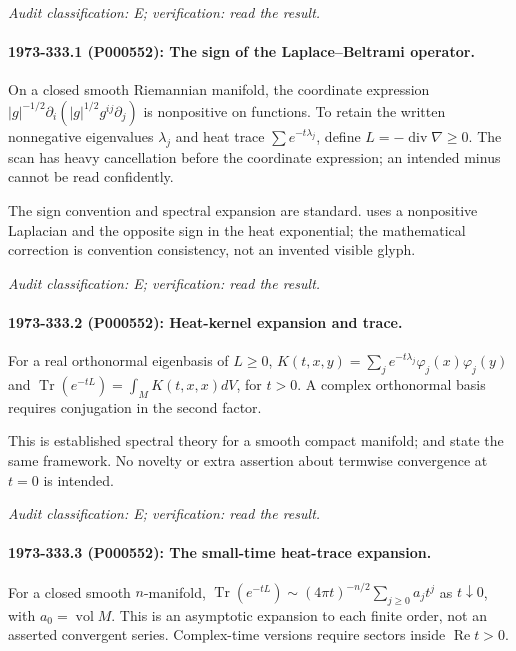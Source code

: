 \emph{Audit classification: E; verification: read the result.}

\paragraph{1973-333.1 (P000552): The sign of the Laplace--Beltrami operator.}
On a closed smooth Riemannian manifold, the coordinate expression \(|g|^{-1/2}\partial_i(|g|^{1/2}g^{ij}\partial_j)\) is nonpositive on functions. To retain the written nonnegative eigenvalues \(\lambda_j\) and heat trace \(\sum e^{-t\lambda_j}\), define \(L=-\operatorname{div}\nabla\ge0\). The scan has heavy cancellation before the coordinate expression; an intended minus cannot be read confidently.

The sign convention and spectral expansion are standard. \citet[\S1]{mckeansinger1967curvature} uses a nonpositive Laplacian and the opposite sign in the heat exponential; the mathematical correction is convention consistency, not an invented visible glyph.

\emph{Audit classification: E; verification: read the result.}

\paragraph{1973-333.2 (P000552): Heat-kernel expansion and trace.}
For a real orthonormal eigenbasis of \(L\ge0\), \(K(t,x,y)=\sum_j e^{-t\lambda_j}\varphi_j(x)\varphi_j(y)\) and \(\operatorname{Tr}(e^{-tL})=\int_MK(t,x,x)dV\), for \(t>0\). A complex orthonormal basis requires conjugation in the second factor.

This is established spectral theory for a smooth compact manifold; \citet[\S1 and heat-kernel construction]{mckeansinger1967curvature} and \citet[introduction]{gilkey1979recursion} state the same framework. No novelty or extra assertion about termwise convergence at \(t=0\) is intended.

\emph{Audit classification: E; verification: read the result.}

\paragraph{1973-333.3 (P000552): The small-time heat-trace expansion.}
For a closed smooth \(n\)-manifold, \(\operatorname{Tr}(e^{-tL})\sim(4\pi t)^{-n/2}\sum_{j\ge0}a_jt^j\) as \(t\downarrow0\), with \(a_0=\operatorname{vol}M\). This is an asymptotic expansion to each finite order, not an asserted convergent series. Complex-time versions require sectors inside \(\operatorname{Re}t>0\).

